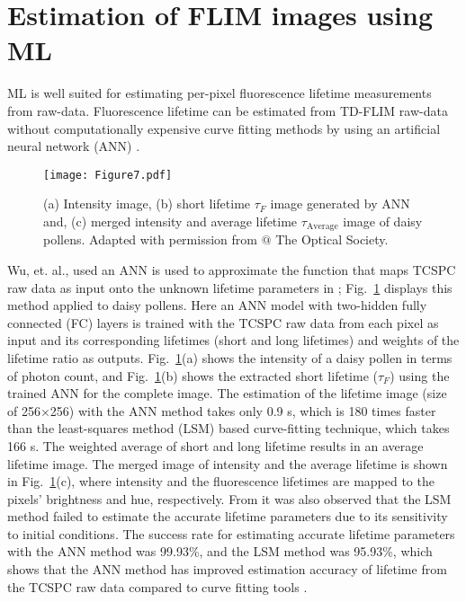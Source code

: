 \documentclass[12pt]{iopart}
\begin{document}
\section{Estimation of FLIM images using ML}\label{sec1}
ML is well suited for estimating per-pixel fluorescence lifetime measurements from raw-data. Fluorescence lifetime can be estimated from TD-FLIM raw-data without computationally expensive curve fitting methods by using an artificial neural network (ANN) \cite{ann}.

\begin{figure}[!t]
\centering
\texttt{[image: Figure7.pdf]}
\caption{(a) Intensity image, (b) short lifetime $\tau_F$ image generated by ANN and, (c) merged intensity and average lifetime $\tau_{\mathrm{Average}}$ image of daisy pollens. Adapted with permission from \cite{ann} $@$ The Optical Society.}\label{fig1_ann}
\end{figure}
 
Wu, et. al., used an ANN is used to approximate the function that maps TCSPC raw data as input onto the unknown lifetime parameters in \cite{ann}; Fig.~\ref{fig1_ann} displays this method applied to daisy pollens. Here an ANN model with two-hidden fully connected (FC) layers is trained with the TCSPC raw data from each pixel as input and its corresponding lifetimes (short and long lifetimes) and weights of the lifetime ratio as outputs. Fig.~\ref{fig1_ann}(a) shows the intensity of a daisy pollen in terms of photon count, and Fig.~\ref{fig1_ann}(b) shows the extracted short lifetime ($\tau_F$) using the trained ANN for the complete image. The estimation of the lifetime image (size of 256$\times$256) with the ANN method takes only 0.9 s, which is 180 times faster than the least-squares method (LSM) based curve-fitting technique, which takes 166 s. The weighted average of short and long lifetime results in an average lifetime image. The merged image of intensity and the average lifetime is shown in Fig.~\ref{fig1_ann}(c), where intensity and the fluorescence lifetimes are mapped to the pixels' brightness and hue, respectively. From \cite{ann} it was also observed that the LSM method failed to estimate the accurate lifetime parameters due to its sensitivity to initial conditions. The success rate for estimating accurate lifetime parameters with the ANN method was 99.93\%, and the LSM method was 95.93\%, which shows that the ANN method has improved estimation accuracy of lifetime from the TCSPC raw data compared to curve fitting tools \cite{ann}.
\end{document}

